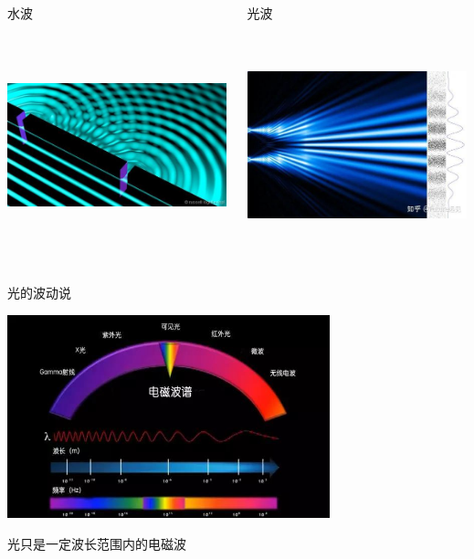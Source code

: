 \begin{frame}
	\begin{columns}
		\begin{column}[t]{0.46\linewidth}
            水波
            \begin{center}
                \includegraphics[width=2.5in,height=2.5in]{figs/2021-12-02-15-46-16.png}
            \end{center}
		\end{column}
		\begin{column}[t]{0.46\linewidth}
            光波
            \begin{center}
                \includegraphics[width=2.5in,height=2.5in]{figs/2021-12-02-15-49-36.png}
            \end{center}
		\end{column}
	\end{columns}
\end{frame}

\begin{frame} {光的波动说}
    \begin{center}
        \includegraphics[width=0.70\textwidth]{figs/2021-12-02-16-23-16.png}
    \end{center}
    光只是一定波长范围内的电磁波
\end{frame}

